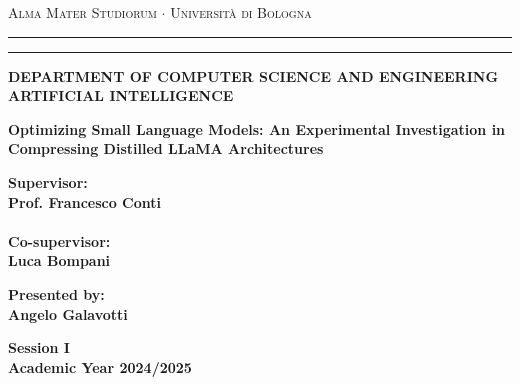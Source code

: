 \documentclass[12pt,a4paper,openright,twoside]{report}
\begin{document}
\begin{titlepage}
	\begin{center}
		{{\Large{\textsc{Alma Mater Studiorum $\cdot$ Università di
							Bologna}}}} \rule[0.1cm]{15.8cm}{0.1mm}
		\rule[0.5cm]{15.8cm}{0.6mm}
		{\small{\bf DEPARTMENT OF COMPUTER SCIENCE
		AND ENGINEERING\\
		ARTIFICIAL INTELLIGENCE }}
	\end{center}
	\vspace{15mm}
	\begin{center}
		{\LARGE{\bf Optimizing Small Language Models: An Experimental Investigation in Compressing Distilled LLaMA Architectures}}\\
		\vspace{3mm}
	\end{center}
	\vspace{40mm}
	\par
	\noindent
	\begin{minipage}[t]{0.47\textwidth}
		{\large{\bf Supervisor:\\
				Prof. Francesco Conti\\\\
				Co-supervisor:\\
				Luca Bompani}}
	\end{minipage}
	\hfill
	\begin{minipage}[t]{0.47\textwidth}\raggedleft
		{\large{\bf Presented by:\\
				Angelo Galavotti}}
	\end{minipage}
	\vspace{20mm}
	\begin{center}
		{\large{\bf Session I\\
				Academic Year 2024/2025}}
	\end{center}
\end{titlepage}
\end{document}
